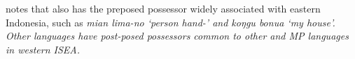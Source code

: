 \citet[68]{Mead2003b} notes that  also has the preposed
possessor widely associated with eastern Indonesia,
such as \it{mian lima-no} ‘person hand-’
and \it{koŋgu bonua} ‘my house’.
Other  languages have post-posed possessors
common to other 
and MP languages in western ISEA.
